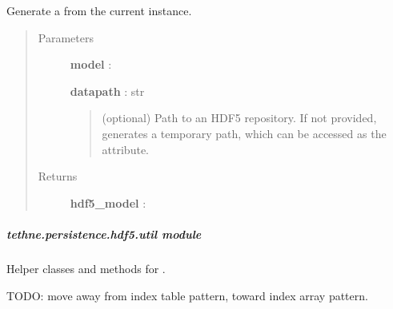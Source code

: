 \documentclass[letterpaper,10pt,english]{sphinxmanual}
\begin{document}
\begin{fulllineitems}
\label{tethne.persistence.hdf5.tapmodel:tethne.persistence.hdf5.tapmodel.to_hdf5}
Generate a {\hyperref[tethne.persistence.hdf5.tapmodel:tethne.persistence.hdf5.tapmodel.HDF5TAPModel]{}} from the current instance.
\begin{quote}\begin{description}
\item[{Parameters}] \leavevmode
\textbf{model} : {\hyperref[tethne.model.social.tapmodel:tethne.model.social.tapmodel.TAPModel]{}}

\textbf{datapath} : str
\begin{quote}

(optional) Path to an HDF5 repository. If not provided, generates
a temporary path, which can be accessed as the  attribute.
\end{quote}

\item[{Returns}] \leavevmode
\textbf{hdf5\_model} : {\hyperref[tethne.persistence.hdf5.tapmodel:tethne.persistence.hdf5.tapmodel.HDF5TAPModel]{}}

\end{description}\end{quote}

\end{fulllineitems}



\subparagraph{tethne.persistence.hdf5.util module}
\label{tethne.persistence.hdf5.util:module-tethne.persistence.hdf5.util}\label{tethne.persistence.hdf5.util:tethne-persistence-hdf5-util-module}\label{tethne.persistence.hdf5.util::doc}
Helper classes and methods for {\hyperref[tethne.persistence.hdf5:module-tethne.persistence.hdf5]{}}.

TODO: move away from index table pattern, toward index array pattern.
\end{document}
